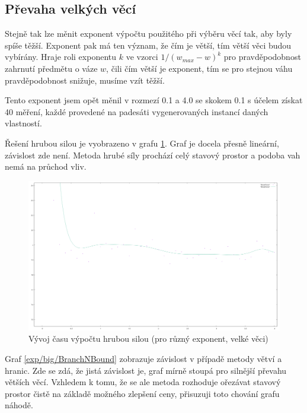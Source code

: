\documentclass[12pt,a4paper]{article}
\begin{document}
\subsection{Převaha velkých věcí}

Stejně tak lze měnit exponent výpočtu použitého při výběru věcí tak, aby byly spíše těžší. Exponent pak má ten význam, že čím je větší, tím větší věci budou vybírány. Hraje roli exponentu $k$ ve vzorci $1/(w_{max}-w)^k$ pro pravděpodobnost zahrnutí předmětu o váze $w$, čili čím větší je exponent, tím se pro stejnou váhu pravděpodobnost snižuje, musíme vzít těžší.

Tento exponent jsem opět měnil v rozmezí 0.1 a 4.0 se skokem 0.1 s účelem získat 40 měření, každé provedené na padesáti vygenerovaných instancí daných vlastností. 

Řešení hrubou silou je vyobrazeno v grafu \ref{exp/big/BruteForce}. Graf je docela přesně lineární, závislost zde není. Metoda hrubé síly prochází celý stavový prostor a podoba vah nemá na průchod vliv.

\begin{figure}[H]
\begin{center}
\includegraphics[width=\textwidth]{exp/big/BruteForce}
\caption{Vývoj času výpočtu hrubou silou (pro různý exponent, velké věci)}
\label{exp/big/BruteForce}
\end{center}
\end{figure}

Graf \ref{exp/big/BranchNBound} zobrazuje závislost v případě metody větví a hranic. Zde se zdá, že jistá závislost je, graf mírně stoupá pro silnější převahu větších věcí. Vzhledem k tomu, že se ale metoda rozhoduje ořezávat stavový prostor čistě na základě možného zlepšení ceny, přisuzuji toto chování grafu náhodě.
\end{document}
